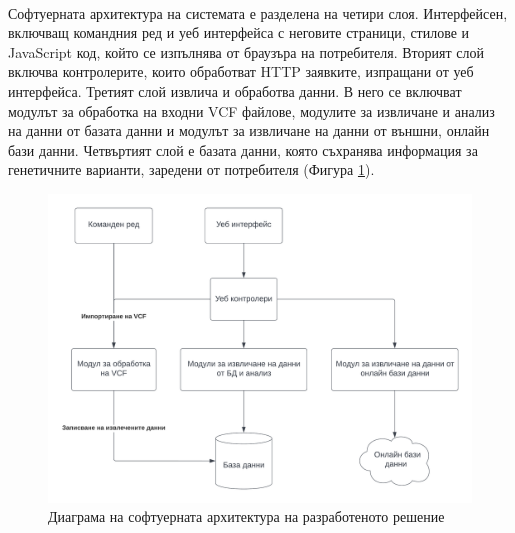 \documentclass[pdftex,cyrillic,14pt,a4page,twoside,openright]{extreport}
\begin{document}
\paragraph{}
Софтуерната архитектура на системата е разделена на четири слоя. Интерфейсен, включващ командния ред и уеб интерфейса с неговите страници, стилове и JavaScript код, който се изпълнява от браузъра на потребителя. Вторият слой включва контролерите, които обработват HTTP заявките, изпращани от уеб интерфейса. Третият слой извлича и обработва данни. В него се включват модулът за обработка на входни VCF файлове, модулите за извличане и анализ на данни от базата данни и модулът за извличане на данни от външни, онлайн бази данни. Четвъртият слой е базата данни, която съхранява информация за генетичните варианти, заредени от потребителя (Фигура \ref{fig:software_architecture}).

\begin{figure}[h]
  \centering
  \includegraphics[width=17cm]{figures/software_architecture}
  \caption {Диаграма на софтуерната архитектура на разработеното решение}
  \label{fig:software_architecture}
\end{figure}
\end{document}
